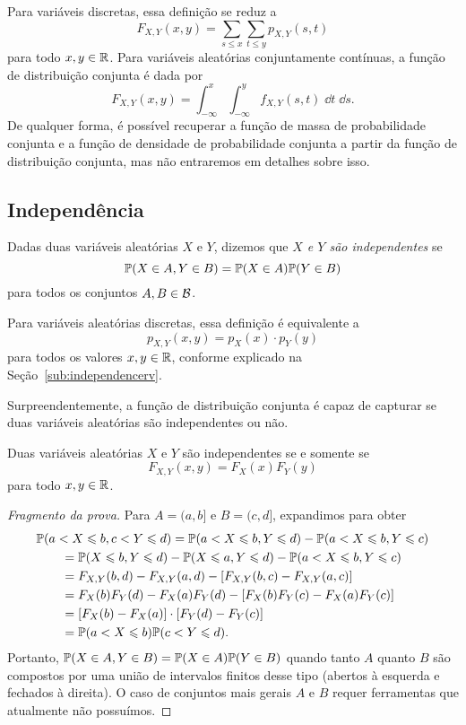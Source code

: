 Para variáveis discretas, essa definição se reduz a
\[
F_{X,Y}(x,y) =
\sum_{s \leq x} \sum_{t \leq y} p_{X,Y}(s,t)
\]
para todo $ x,y\in\mathbb{R} $.
Para variáveis aleatórias conjuntamente contínuas, a função de distribuição conjunta
é dada por
\[
F_{X,Y}(x,y) = \int_{-\infty}^x \int_{-\infty}^y f_{X,Y}(s,t)\;\dd t\;\dd s
.
\]
De qualquer forma, é possível recuperar a função de massa de probabilidade conjunta e a função de densidade de probabilidade conjunta a partir da função de distribuição conjunta, mas não entraremos em detalhes sobre isso.

\subsection{Independência}

\begin{definition}
Dadas duas variáveis aleatórias $ X $ e $ Y $, dizemos que \emph{$ X $ e $ Y $ são independentes} se
\[
\mathbb{P}(X \in A, Y\in B)
=
\mathbb{P}(X \in A)
\mathbb{P}(Y\in B)
\]
para todos os conjuntos $ A, B \in \mathcal B $.
\end{definition}
Para variáveis aleatórias discretas, essa definição é equivalente a
\[
p_{X,Y}(x,y) = p_X(x) \cdot p_Y(y)
\]
para todos os valores $ x,y\in\mathbb{R} $, conforme explicado na Seção~\ref{sub:independencerv}.

Surpreendentemente, a função de distribuição conjunta é capaz de capturar se duas variáveis aleatórias são independentes ou não.

\begin{proposition}
Duas variáveis aleatórias $ X $ e $ Y $ são independentes se e somente se
\[
F_{X,Y}(x,y)
=
F_{X}(x)
F_{Y}(y)
\]
para todo $ x,y\in\mathbb{R} $.
\end{proposition}
\begin{proof}
[Fragmento da prova]
Para $ A = (a,b] $ e $ B= (c,d] $, expandimos para obter
\begin{align}
\MoveEqLeft
\Pb(a<X\leq b, c<Y\leq d)
=
\Pb(a<X\leq b, Y \leq d)
-
\Pb(a<X\leq b, Y \leq c)
\\
&=
\Pb(X\leq b, Y \leq d)
-
\Pb(X \leq a, Y \leq d)
-
\Pb(a<X\leq b, Y \leq c)
\\
&=
F_{X,Y}(b,d)
-
F_{X,Y}(a,d)
-
[ F_{X,Y}(b,c) - F_{X,Y}(a,c) ]
\\
&=
F_{X}(b)
F_{Y}(d)
-
F_{X}(a)
F_{Y}(d)
-
[
F_{X}(b)
F_{Y}(c)
-
F_{X}(a)
F_{Y}(c)
]
\\
&=
[
F_{X}(b)
-
F_{X}(a)
]
\cdot
[
F_{Y}(d)
-
F_{Y}(c)
]
\\
&=
\Pb(a<X\leq b)
\Pb(c<Y\leq d)
.
\end{align}
Portanto,
$ \mathbb{P}(X \in A, Y\in B)
=
\mathbb{P}(X \in A)
\mathbb{P}(Y\in B) $
quando tanto $ A $ quanto $ B $ são compostos por uma união de intervalos finitos desse tipo (abertos à esquerda e fechados à direita).
O caso de conjuntos mais gerais $ A $ e $ B $ requer ferramentas que atualmente não possuímos.
\end{proof}

